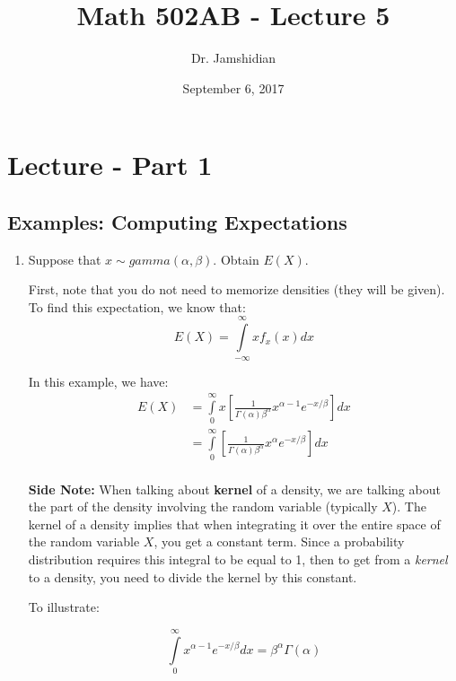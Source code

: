 \documentclass{article}
\title{Math 502AB - Lecture 5}
\author{Dr. Jamshidian}
\date{September 6, 2017}
\begin{document}
\maketitle

\section{Lecture - Part 1}
\subsection{Examples: Computing Expectations}

\begin{enumerate}
    \item Suppose that $x\sim gamma(\alpha,\beta)$. Obtain $E(X)$.
    
    First, note that you do not need to memorize densities (they will be given). To find this expectation, we know that:
    \begin{equation*}
        E(X) = \int\limits_{-\infty}^\infty x f_x(x) dx
    \end{equation*}
    
    In this example, we have:
    \begin{equation*}
    \begin{split}
        E(X) &= \int\limits_0^\infty x \left[\frac{1}{\Gamma(\alpha)\beta^\alpha} x^{\alpha-1}e^{-x/\beta}\right]dx\\
        &= \int\limits_0^\infty  \left[\frac{1}{\Gamma(\alpha)\beta^\alpha} x^{\alpha}e^{-x/\beta}\right]dx\\
    \end{split}
    \end{equation*}
    
    \textbf{Side Note:} When talking about \textbf{kernel} of a density, we are talking about the part of the density involving the random variable (typically $X$). The kernel of a density implies that when integrating it over the entire space of the random variable $X$, you get a constant term. Since a probability distribution requires this integral to be equal to 1, then to get from a \textit{kernel} to a density, you need to divide the kernel by this constant.
    
    To illustrate:
    
    \begin{equation*}
        \int\limits_0^\infty x^{\alpha-1} e^{-x/\beta}dx = \beta^{\alpha}\Gamma(\alpha)
    \end{equation*}
    

\end{enumerate}
\end{document}

